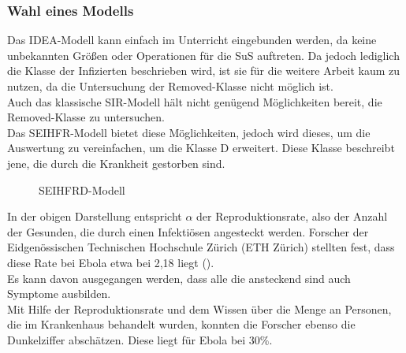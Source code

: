 \subsubsection{Wahl eines Modells}
Das IDEA-Modell kann einfach im Unterricht eingebunden werden, da keine unbekannten Größen oder Operationen für die SuS auftreten. Da jedoch lediglich die Klasse der Infizierten beschrieben wird, ist sie für die weitere Arbeit kaum zu nutzen, da die Untersuchung der Removed-Klasse nicht möglich ist.\\
 Auch das klassische SIR-Modell hält nicht genügend Möglichkeiten bereit, die Removed-Klasse zu untersuchen.\\
  Das SEIHFR-Modell bietet diese Möglichkeiten, jedoch wird dieses, um die Auswertung zu vereinfachen, um die Klasse D erweitert. Diese Klasse beschreibt jene, die durch die Krankheit gestorben sind. 
  \begin{figure}
\begin{center}
\end{center}
\caption{SEIHFRD-Modell}\label{fig:ssec:model}
\end{figure}
In der obigen Darstellung entspricht $\alpha$ der Reproduktionsrate, also der Anzahl der Gesunden, die durch einen Infektiösen angesteckt werden. Forscher der Eidgenössischen Technischen Hochschule Zürich (ETH Zürich) stellten fest, dass diese Rate bei Ebola etwa bei 2,18 liegt (\cite{Stadler2014}).\\
Es kann davon ausgegangen werden, dass alle die ansteckend sind auch Symptome ausbilden.\\
Mit Hilfe der Reproduktionsrate und dem Wissen über die Menge an Personen, die im Krankenhaus behandelt wurden, konnten die Forscher ebenso die Dunkelziffer abschätzen. Diese liegt für Ebola bei 30\%.\\
